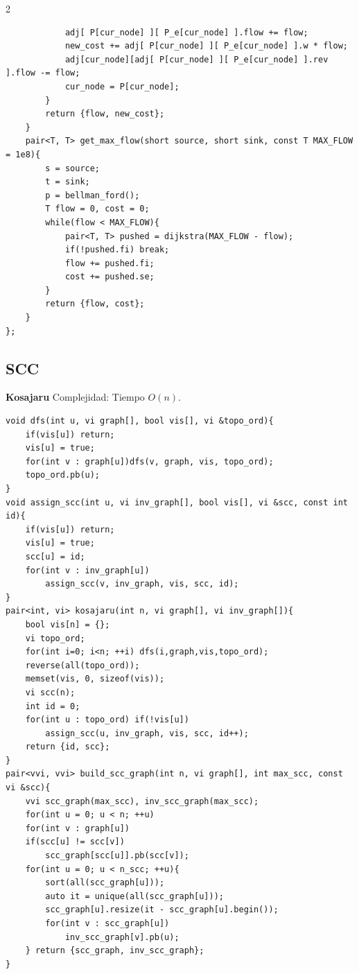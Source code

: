 \documentclass[10pt,spanish,mexico]{article}
\numberwithin{equation}{section}
\begin{document}
\begin{multicols}{2}
\begin{verbatim}
            adj[ P[cur_node] ][ P_e[cur_node] ].flow += flow;
            new_cost += adj[ P[cur_node] ][ P_e[cur_node] ].w * flow;
            adj[cur_node][adj[ P[cur_node] ][ P_e[cur_node] ].rev ].flow -= flow;
            cur_node = P[cur_node];
        }
        return {flow, new_cost};
    }
    pair<T, T> get_max_flow(short source, short sink, const T MAX_FLOW = 1e8){
        s = source;
        t = sink;
        p = bellman_ford();
        T flow = 0, cost = 0;
        while(flow < MAX_FLOW){
            pair<T, T> pushed = dijkstra(MAX_FLOW - flow);
            if(!pushed.fi) break;
            flow += pushed.fi;
            cost += pushed.se;
        }
        return {flow, cost};
    }
};
\end{verbatim}

\vspace{-1.2\baselineskip}
\hrulefill
\subsection{SCC}
\textbf{Kosajaru}
Complejidad: Tiempo $O(n)$.
\begin{verbatim}
void dfs(int u, vi graph[], bool vis[], vi &topo_ord){
    if(vis[u]) return;
    vis[u] = true;
    for(int v : graph[u])dfs(v, graph, vis, topo_ord);
    topo_ord.pb(u);
}
void assign_scc(int u, vi inv_graph[], bool vis[], vi &scc, const int id){
    if(vis[u]) return;
    vis[u] = true;
    scc[u] = id;
    for(int v : inv_graph[u])
        assign_scc(v, inv_graph, vis, scc, id);
}
pair<int, vi> kosajaru(int n, vi graph[], vi inv_graph[]){
    bool vis[n] = {};
    vi topo_ord;
    for(int i=0; i<n; ++i) dfs(i,graph,vis,topo_ord);
    reverse(all(topo_ord));
    memset(vis, 0, sizeof(vis));
    vi scc(n);
    int id = 0;
    for(int u : topo_ord) if(!vis[u])
        assign_scc(u, inv_graph, vis, scc, id++);
    return {id, scc};
}
pair<vvi, vvi> build_scc_graph(int n, vi graph[], int max_scc, const vi &scc){
    vvi scc_graph(max_scc), inv_scc_graph(max_scc);
    for(int u = 0; u < n; ++u)
    for(int v : graph[u])
    if(scc[u] != scc[v])
        scc_graph[scc[u]].pb(scc[v]);
    for(int u = 0; u < n_scc; ++u){
        sort(all(scc_graph[u]));
        auto it = unique(all(scc_graph[u]));
        scc_graph[u].resize(it - scc_graph[u].begin());
        for(int v : scc_graph[u])
            inv_scc_graph[v].pb(u);
    } return {scc_graph, inv_scc_graph};
}
\end{verbatim}

\vspace{-1.2\baselineskip}
\hrulefill

\end{multicols}
\end{document}
